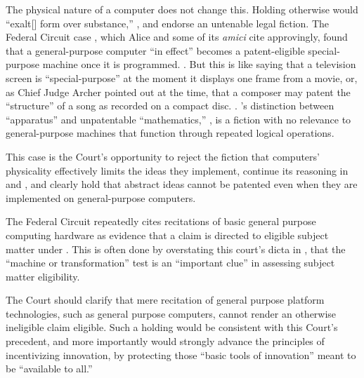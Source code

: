 \documentclass{scotus}
\begin{document}
The physical nature of a computer does not change this.  Holding otherwise would
``exalt[] form over substance,'' , and endorse an
untenable legal fiction.  The Federal Circuit case , which Alice
and some of its \emph{amici} cite approvingly, \iffalse COMMENTED AS UNNECESSARY
EXPLANATION --ANNA illustrates why this Court has previously rejected such “rigid
line-drawing.” \sentence{alappat; bilski at 99999}.  \inline{alappat} drew a
formalistic distinction between general-purpose and special-purpose computers
wherein ideas implemented on the second were patentable, then relied on the
fiction that a \fi found that a general-purpose computer ``in effect'' becomes a
patent-eligible special-purpose machine once it is programmed.  . But this is like saying that a television screen is
``special-purpose'' at the moment it displays one frame from a movie, or, as Chief
Judge Archer pointed out at the time, that a composer may patent the ``structure''
of a song as recorded on a compact disc.  . 's distinction between ``apparatus''
and unpatentable ``mathematics,'' , is a fiction with no
relevance to general-purpose machines that function through repeated logical
operations. \iffalse COMMENTED BECAUSE I COULDN'T FIND THIS AND IT'S NOT NECESSARY
--ANNA and moreover this Court in \inline{bilski} rejected the idea that use of
computer technology is categorically sufficient to confer patent protection.
\sentence{see bilski at 3227}. \fi

This case is the Court's opportunity to reject the fiction that computers'
physicality effectively limits the ideas they implement, continue its reasoning in
 and , and clearly hold that abstract ideas cannot be
patented even when they are implemented on general-purpose computers.

The Federal Circuit repeatedly cites recitations of basic general purpose
computing hardware as evidence that a claim is directed to eligible
subject matter under . This is often done by overstating this
court's dicta in , that the ``machine or transformation'' test is
an ``important clue'' in assessing subject matter eligibility.

The Court should clarify that mere recitation of general purpose platform
technologies, such as general purpose computers, cannot render an otherwise
ineligible claim eligible. Such a holding would be consistent with this Court's
precedent, and more importantly would strongly advance the principles of
incentivizing innovation, by protecting those ``basic tools of innovation''
meant to be ``available to all.''
\end{document}
